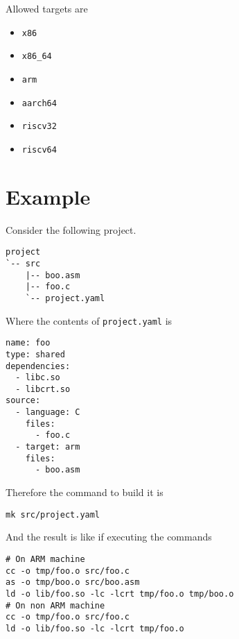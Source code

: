 \documentclass[
   12pt,                         %
   openright,                    %
   twoside,                      %
   a4paper,                      %
   sumario = tradicional,        %
   english,                      %
   xcolor=table                  %
]{abntex2}
\begin{document}
Allowed targets are
\begin{itemize}
   \item \texttt{x86}
   \item \texttt{x86\_64}
   \item \texttt{arm}
   \item \texttt{aarch64}
   \item \texttt{riscv32}
   \item \texttt{riscv64}
\end{itemize}

\section{Example}

Consider the following project.

\begin{lstlisting}
project
`-- src
    |-- boo.asm
    |-- foo.c
    `-- project.yaml
\end{lstlisting}

Where the contents of \texttt{project.yaml} is

\begin{lstlisting}[style=yaml]
name: foo
type: shared
dependencies:
  - libc.so
  - libcrt.so
source:
  - language: C
    files:
      - foo.c
  - target: arm
    files:
      - boo.asm
\end{lstlisting}

\noindent
Therefore the command to build it is

\begin{lstlisting}[style=bash]
mk src/project.yaml
\end{lstlisting}

\noindent
And the result is like if executing the commands

\begin{lstlisting}[style=bash]
# On ARM machine
cc -o tmp/foo.o src/foo.c
as -o tmp/boo.o src/boo.asm
ld -o lib/foo.so -lc -lcrt tmp/foo.o tmp/boo.o
# On non ARM machine
cc -o tmp/foo.o src/foo.c
ld -o lib/foo.so -lc -lcrt tmp/foo.o
\end{lstlisting}
\end{document}
